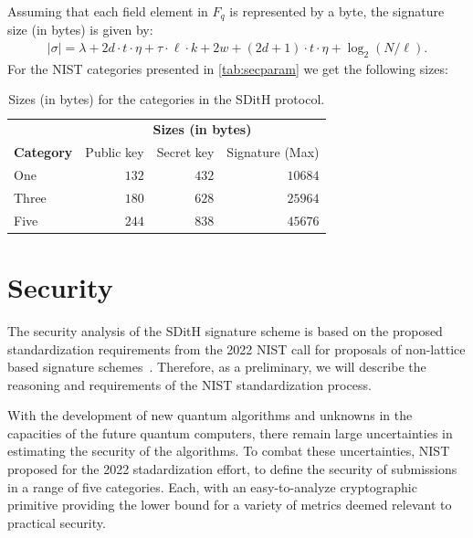 \documentclass[11pt]{report}
\theoremstyle{definition}
\theoremstyle{plain}
\begin{document}
Assuming that each field element in $F_q$ is represented by a byte, the signature size (in bytes) is given by:
\begin{align*}
  |\sigma| =
  \lambda + 2d \cdot t \cdot \eta + \tau \cdot \ell \cdot k + 2w + (2d + 1) \cdot t \cdot \eta + \log_2(N / \ell).
\end{align*}
For the NIST categories presented in \autoref{tab:secparam} we get the following sizes:

\begin{table}[H]
  \centering
  \begin{tabular}{|l|r|r|r|}
    \hline
                      & \multicolumn{3}{c}{\textbf{Sizes (in bytes)}}                                \\
    \textbf{Category} & Public key                                    & Secret key & Signature (Max) \\
    \hline
    One               & $132$                                         & $432$      & $10684$         \\
    Three             & $180$                                         & $628$      & $25964$         \\
    Five              & $244$                                         & $838$      & $45676$         \\
    \hline
  \end{tabular}
  \caption{Sizes (in bytes) for the categories in the SDitH protocol.}
  \label{tab:sizes}
\end{table}

\section{Security}

The security analysis of the SDitH signature scheme is based on the proposed standardization requirements from the 2022 NIST call for proposals of non-lattice based signature schemes~\cite{nistcall}. Therefore, as a preliminary, we will describe the reasoning and requirements of the NIST standardization process.

With the development of new quantum algorithms and unknowns in the capacities of the future quantum computers, there remain large uncertainties in estimating the security of the algorithms. To combat these uncertainties, NIST proposed for the 2022 stadardization effort, to define the security of submissions in a range of five categories. Each, with an easy-to-analyze cryptographic primitive providing the lower bound for a variety of metrics deemed relevant to practical security.
\end{document}
